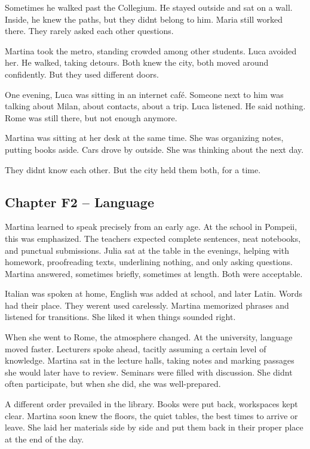 \documentclass[
]{article}
\begin{document}
Sometimes he walked past the Collegium. He stayed outside and sat on a wall. Inside, he knew the paths, but they didn\textquotesingle t belong to him. Maria still worked there. They rarely asked each other questions.

Martina took the metro, standing crowded among other students. Luca avoided her. He walked, taking detours. Both knew the city, both moved around confidently. But they used different doors.

One evening, Luca was sitting in an internet café. Someone next to him was talking about Milan, about contacts, about a trip. Luca listened. He said nothing. Rome was still there, but not enough anymore.

Martina was sitting at her desk at the same time. She was organizing notes, putting books aside. Cars drove by outside. She was thinking about the next day.

They didn\textquotesingle t know each other. But the city held them both, for a time.

\subsection{Chapter F2 -- Language}\label{chapter-f2-language}

Martina learned to speak precisely from an early age. At the school in Pompeii, this was emphasized. The teachers expected complete sentences, neat notebooks, and punctual submissions. Julia sat at the table in the evenings, helping with homework, proofreading texts, underlining nothing, and only asking questions. Martina answered, sometimes briefly, sometimes at length. Both were acceptable.

Italian was spoken at home, English was added at school, and later Latin. Words had their place. They weren\textquotesingle t used carelessly. Martina memorized phrases and listened for transitions. She liked it when things sounded right.

When she went to Rome, the atmosphere changed. At the university, language moved faster. Lecturers spoke ahead, tacitly assuming a certain level of knowledge. Martina sat in the lecture halls, taking notes and marking passages she would later have to review. Seminars were filled with discussion. She didn\textquotesingle t often participate, but when she did, she was well-prepared.

A different order prevailed in the library. Books were put back, workspaces kept clear. Martina soon knew the floors, the quiet tables, the best times to arrive or leave. She laid her materials side by side and put them back in their proper place at the end of the day.
\end{document}
